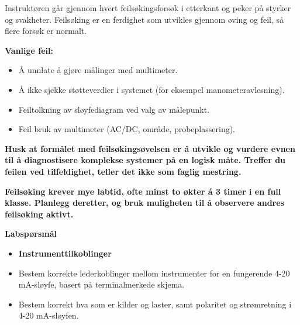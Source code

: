 Instruktøren går gjennom hvert feilsøkingsforsøk i etterkant og peker på styrker og svakheter. Feilsøking er en ferdighet som utvikles gjennom øving og feil, så flere forsøk er normalt.

\vskip 10pt

{\bf Vanlige feil:}

\begin{itemize}
\item{} Å unnlate å gjøre målinger med multimeter.
\item{} Å ikke sjekke støtteverdier i systemet (for eksempel manometeravlesning).
\item{} Feiltolkning av sløyfediagram ved valg av målepunkt.
\item{} Feil bruk av multimeter (AC/DC, område, probeplassering).
\end{itemize}

\vskip 10pt

{\bf Husk at formålet med feilsøkingsøvelsen er å utvikle og vurdere evnen til å diagnostisere komplekse systemer på en logisk måte. Treffer du feilen ved tilfeldighet, teller det ikke som faglig mestring.}

\vskip 10pt

{\bf Feilsøking krever mye labtid, ofte minst to økter á 3 timer i en full klasse. Planlegg deretter, og bruk muligheten til å observere andres feilsøking aktivt.}








\vfil \eject

\noindent
{\bf Labspørsmål}

\vskip 5pt

\begin{itemize}
\item{} {\bf Instrumenttilkoblinger}
\item{} Bestem korrekte lederkoblinger mellom instrumenter for en fungerende 4-20 mA-sløyfe, basert på terminalmerkede skjema.
\item{} Bestem korrekt hva som er kilder og laster, samt polaritet og strømretning i 4-20 mA-sløyfen.
\end{itemize}

\filbreak

